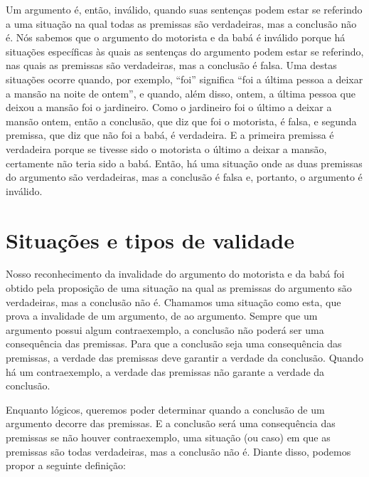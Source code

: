 Um argumento é, então, inválido, quando suas sentenças podem estar se referindo a uma situação na qual todas as premissas são verdadeiras, mas a conclusão não é.
Nós sabemos que o argumento do motorista e da babá é inválido porque há situações específicas às quais as sentenças do argumento podem estar se referindo, nas quais as premissas são verdadeiras, mas a conclusão é falsa.
Uma destas situações ocorre quando, por exemplo, ``foi'' significa ``foi a última pessoa a deixar a mansão na noite de ontem'', e quando, além disso, ontem, a última pessoa que deixou a mansão foi o jardineiro.
Como o jardineiro foi o último a deixar a mansão ontem, então a conclusão, que diz que foi o motorista, é falsa, e segunda premissa, que diz que não foi a babá, é verdadeira.
E a primeira premissa é verdadeira porque se tivesse sido o motorista o último a deixar a mansão, certamente não teria sido a babá.
Então, há uma situação onde as duas premissas do argumento são verdadeiras, mas a conclusão é falsa e, portanto, o argumento é inválido.


\section{Situações e tipos de validade}
\label{ss:Validade}

Nosso reconhecimento da invalidade do argumento do motorista e da babá foi obtido pela proposição de uma situação na qual as premissas do argumento são verdadeiras, mas a conclusão não é.
Chamamos uma situação como esta, que prova a invalidade de um argumento, de  ao argumento.
Sempre que um argumento possui algum contraexemplo, a conclusão não poderá ser uma consequência das premissas.
Para que a conclusão seja uma consequência das premissas, a verdade das premissas deve garantir a verdade da conclusão. Quando há um contraexemplo, a verdade das premissas não garante a verdade da conclusão.

Enquanto lógicos, queremos poder determinar quando a conclusão de um argumento decorre das premissas.
E a conclusão será uma consequência das premissas se não houver contraexemplo, uma situação (ou caso) em que as premissas são todas verdadeiras, mas a conclusão não é.
Diante disso, podemos propor a seguinte definição:


